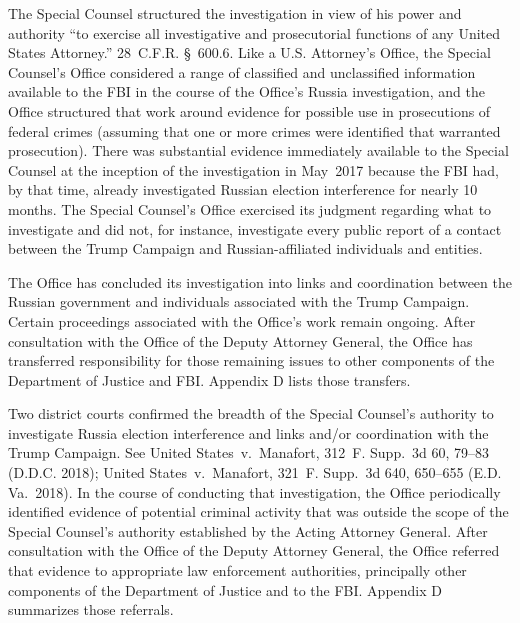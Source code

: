 The Special Counsel structured the investigation in view of his power and authority ``to exercise all investigative and prosecutorial functions of any United States Attorney.'' 28~C.F.R. \S~600.6. Like a U.S. Attorney's Office, the Special Counsel's Office considered a range of classified and unclassified information available to the FBI in the course of the Office's Russia investigation, and the Office structured that work around evidence for possible use in prosecutions of federal crimes (assuming that one or more crimes were identified that warranted prosecution).
There was substantial evidence immediately available to the Special Counsel at the inception of the investigation in May~2017 because the FBI had, by that time, already investigated Russian election interference for nearly 10 months.
The Special Counsel's Office exercised its judgment regarding what to investigate and did not, for instance, investigate every public report of a contact between the Trump Campaign and Russian-affiliated individuals and entities.

The Office has concluded its investigation into links and coordination between the Russian government and individuals associated with the Trump Campaign.
Certain proceedings associated with the Office's work remain ongoing.
After consultation with the Office of the Deputy Attorney General, the Office has transferred responsibility for those remaining issues to other components of the Department of Justice and FBI\null.
Appendix D lists those transfers.

Two district courts confirmed the breadth of the Special Counsel's authority to investigate Russia election interference and links and/or coordination with the Trump Campaign.
See United States~v.\ Manafort, 312~F. Supp.~3d 60, 79--83 (D.D.C. 2018); United States~v.\ Manafort, 321~F. Supp.~3d 640, 650--655 (E.D. Va.~2018).
In the course of conducting that investigation, the Office periodically identified evidence of potential criminal activity that was outside the scope of the Special Counsel's authority established by the Acting Attorney General.
After consultation with the Office of the Deputy Attorney General, the Office referred that evidence to appropriate law enforcement authorities, principally other components of the Department of Justice and to the FBI\null.
Appendix D summarizes those referrals.

\hr

